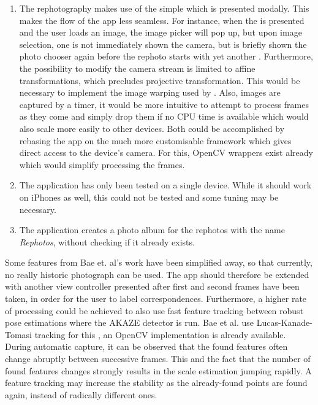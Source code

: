 \begin{enumerate}
   \item The rephotography makes use of the simple
       which is presented modally. This makes the
      flow of the app less seamless. For instance, when the
       is presented and the user loads an image,
      the image picker will pop up, but upon image selection, one is not
      immediately shown the camera, but is briefly shown the photo chooser again
      before the rephoto starts with yet another .
      Furthermore, the possibility to modify the camera stream is limited to
      affine transformations, which precludes projective transformation. This
      would be necessary to implement the image warping used by \citet{bae2010}.
      Also, images are captured by a timer, it would be more intuitive to
      attempt to process frames as they come and simply drop them if no CPU time
      is available which would also scale more easily to other devices. Both
      could be accomplished by rebasing the app on the much more customisable
       framework which gives direct access to the device's
      camera. For this, OpenCV wrappers exist already which would simplify
      processing the frames.  

   \item The application has only been tested on a single device. While it
      should work on iPhones as well, this could not be tested and some tuning
      may be necessary.

   \item The application creates a photo album for the rephotos with the name
      \emph{Rephotos}, without checking if it already exists.

\end{enumerate}

Some features from Bae et. al's work have been simplified away, so that
currently, no really historic photograph can be used. The app should therefore
be extended with another view controller presented after first and second frames
have been taken, in order for the user to label correspondences. Furthermore, a
higher rate of processing could be achieved to also use fast feature tracking
between robust pose estimations where the AKAZE detector is run. Bae et al. use
Lucas-Kanade-Tomasi tracking for this \citep{lucas1981,tomasi1991}, an OpenCV
implementation is already available. During automatic capture, it can be
observed that the found features often change abruptly between successive
frames. This and the fact that the number of found features changes strongly
results in the scale estimation jumping rapidly. A feature tracking may increase
the stability as the already-found points are found again, instead of radically
different ones.

